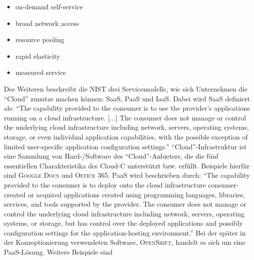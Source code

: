 \begin{itemize}
	\item on-demand self-service
	\item broad network access
	\item resource pooling
	\item rapid elasticity
	\item measured service
\end{itemize}
Des Weiteren beschreibt die \ac{NIST} drei Servicemodelle, wie sich Unternehmen die \enquote{Cloud} zunutze machen können: \ac{SaaS}, \ac{PaaS} und \ac{IaaS}. Dabei wird \ac{SaaS} definiert als: \enquote{The capability  provided to the consumer is to use the provider’s applications running on a cloud infrastructure. [...] The consumer does not manage or control the underlying cloud infrastructure including network, servers, operating systems, storage, or even individual application capabilities, with the possible exception of limited user-specific application configuration settings.}\autocite[][S.\,2]{mell_nist_2011} \enquote{Cloud}-Infrastruktur ist eine Sammlung von Hard-/Software des \enquote{Cloud}-Anbieters, die die fünf essentiellen Charakteristika des \ac{Cloud-C} unterstützt bzw. erfüllt. Beispiele hierfür sind \textsc{Google Docs} und \textsc{Office 365}. \ac{PaaS} wird beschrieben durch: \enquote{The capability provided to the consumer is to deploy onto the cloud infrastructure consumer-created or acquired applications created using programming languages, libraries, services, and tools supported by the provider. The consumer does
not manage or control the underlying cloud infrastructure including network, servers, operating systems, or storage, but has control over the deployed applications and possibly configuration settings for the application-hosting environment.}\autocite[][S.\,2]{mell_nist_2011} Bei der später in der Konzeptionierung verwendeten Software, \textsc{OpenShift}, handelt es sich um eine \ac{PaaS}-Lösung. Weitere Beispiele sind 
